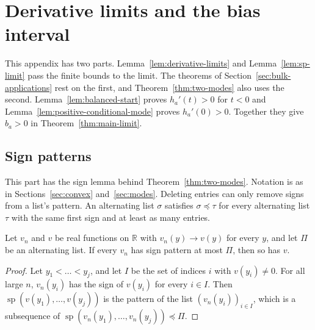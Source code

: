 \section{Derivative limits and the bias interval}\label{app:modes}

This appendix has two parts. Lemma~\ref{lem:derivative-limits} and
Lemma~\ref{lem:sp-limit} pass the finite bounds to the limit. The
theorems of Section~\ref{sec:bulk-applications} rest on the first, and
Theorem~\ref{thm:two-modes} also uses the second.
Lemma~\ref{lem:balanced-start} proves
$h_a'(t)>0$ for $t<0$ and Lemma~\ref{lem:positive-conditional-mode}
proves $h_a'(0)>0$. Together they give $b_a>0$ in
Theorem~\ref{thm:main-limit}.



\subsection{Sign patterns}

This part has the sign lemma behind
Theorem~\ref{thm:two-modes}. Notation is as in
Sections~\ref{sec:convex} and~\ref{sec:modes}.
Deleting entries can only remove signs from a list's pattern. An alternating list $\sigma$ satisfies
$\sigma\preceq\tau$ for every alternating list $\tau$ with the same first sign and at
least as many entries.

\begin{lemma}\label{lem:sp-limit}
Let $v_n$ and $v$ be real functions on $\mathbb R$ with $v_n(y)\to v(y)$ for
every $y$, and let $\Pi$ be an alternating list. If every $v_n$ has sign pattern at
most $\Pi$, then so has $v$.
\end{lemma}

\begin{proof}
Let $y_1<\dots<y_j$, and let $I$ be the set of indices $i$ with $v(y_i)\ne0$.
For all large $n$, $v_n(y_i)$ has the sign of $v(y_i)$ for every $i\in I$.
Then $\operatorname{sp}(v(y_1),\dots,v(y_j))$ is the pattern of the list
$(v_n(y_i))_{i\in I}$, which is a subsequence of
$\operatorname{sp}(v_n(y_1),\dots,v_n(y_j))\preceq\Pi$.
\end{proof}


